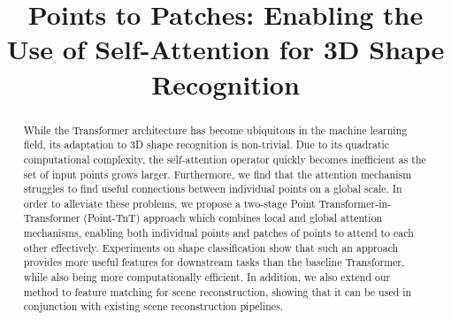 \documentclass[a4paper,conference]{IEEEtran}
\begin{document}
\title{Points to Patches: Enabling the Use of Self-Attention for 3D Shape Recognition}


\author{
}


\maketitle

\begin{abstract}
While the Transformer architecture has become ubiquitous in the machine learning field, its adaptation to 3D shape recognition is non-trivial. Due to its quadratic computational complexity, the self-attention operator quickly becomes inefficient as the set of input points grows larger. Furthermore, we find that the attention mechanism struggles to find useful connections between individual points on a global scale. In order to alleviate these problems, we propose a two-stage Point Transformer-in-Transformer (Point-TnT) approach which combines local and global attention mechanisms, enabling both individual points and patches of points to attend to each other effectively. Experiments on shape classification show that such an approach provides more useful features for downstream tasks than the baseline Transformer, while also being more computationally efficient. In addition, we also extend our method to feature matching for scene reconstruction, showing that it can be used in conjunction with existing scene reconstruction pipelines.
\end{abstract}
\end{document}
